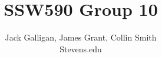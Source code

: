 %

\begin{titlepage}
        \title{SSW590 Group 10}
        \author{Jack Galligan, James Grant, Collin Smith \\ Stevens.edu }
        \conferraldate{}{\today} \maketitle
\end{titlepage}

\makecopyright

\begin{abstract}
\end{abstract}


% 


\contentspage

\tablelistpage

\figurelistpage